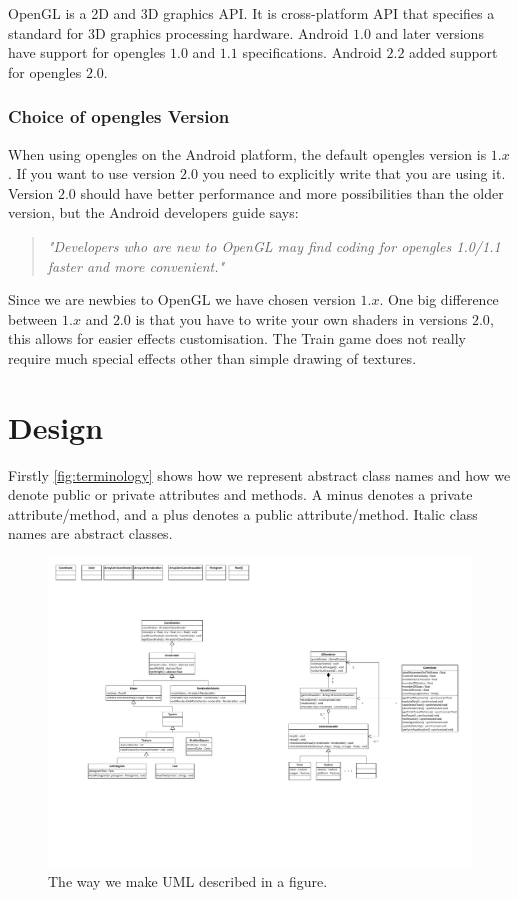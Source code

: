 OpenGL is a 2D and 3D graphics API. It is cross-platform API that specifies a standard for 3D graphics processing hardware. Android $1.0$ and later versions have support for \ac{opengles} $1.0$ and $1.1$ specifications. Android $2.2$ added support for \ac{opengles} $2.0$. \citep{androidopengl, khronosopengles}

\subsubsection*{Choice of \ac{opengles} Version}
When using \ac{opengles} on the Android platform, the default \ac{opengles} version is $1.x$. If you want to use version $2.0$ you need to explicitly write that you are using it. Version $2.0$ should have better performance and more possibilities than the older version, but the Android developers guide says:
\begin{quote}
\textit{"Developers who are new to OpenGL may find coding for \ac{opengles} 1.0/1.1 faster and more convenient."} \citep{androidopengl}
\end{quote}
Since we are newbies to OpenGL we have chosen version $1.x$. One big difference between $1.x$ and $2.0$ is that you have to write your own shaders in versions $2.0$, this allows for easier effects customisation. The Train game does not really require much special effects other than simple drawing of textures.

\section{Design}
Firstly \autoref{fig:terminology} shows how we represent abstract class names and how we denote public or private attributes and methods. A minus denotes a private attribute/method, and a plus denotes a public attribute/method. Italic class names are abstract classes.
\begin{figure}[H]
\centering
\includegraphics[page=4,width=0.7\linewidth]{img/opengl.pdf}
\caption{The way we make UML described in a figure.}
\label{fig:terminology}
\end{figure}

